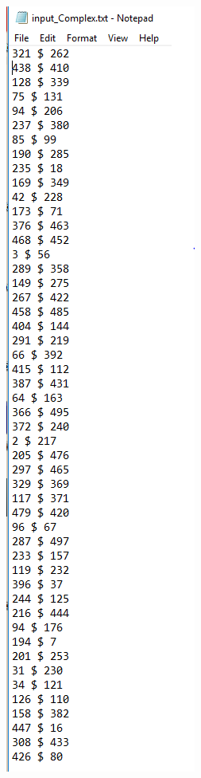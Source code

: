 \documentclass[12pt, titlepage]{article}
\begin{document}
\begin{figure}[h!]
\centering
\begin{minipage}[b]{0.38\textwidth}
 \includegraphics[width=\textwidth]{Input_complex}

\end{minipage}
\end{figure}
\end{document}
